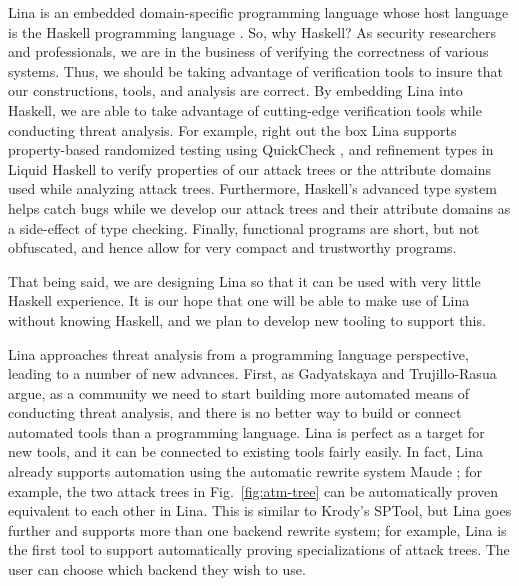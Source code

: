 \documentclass{llncs}
\begin{document}
Lina is an embedded domain-specific programming language whose host
language is the Haskell programming language \cite{jones2003haskell}.
So, why Haskell?  As security researchers and professionals, we are in
the business of verifying the correctness of various systems. Thus, we
should be taking advantage of verification tools to insure that our
constructions, tools, and analysis are correct.  By embedding Lina
into Haskell, we are able to take advantage of cutting-edge
verification tools while conducting threat analysis.  For example,
right out the box Lina supports property-based randomized testing
using QuickCheck \cite{Claessen:2011:QLT:1988042.1988046}, and
refinement types in Liquid Haskell
\cite{Vazou:2014:RTH:2692915.2628161} to verify properties of our
attack trees or the attribute domains used while analyzing attack
trees.  Furthermore, Haskell's advanced type system helps catch bugs
while we develop our attack trees and their attribute domains as a
side-effect of type checking.  Finally, functional programs are short,
but not obfuscated, and hence allow for very compact and trustworthy
programs.

That being said, we are designing Lina so that it can be used with
very little Haskell experience.  It is our hope that one will be able
to make use of Lina without knowing Haskell, and we plan to develop
new tooling to support this.

Lina approaches threat analysis from a programming language
perspective, leading to a number of new advances.  First, as
Gadyatskaya and Trujillo-Rasua \cite{10.1007/978-3-319-74860-3_9}
argue, as a community we need to start building more automated means
of conducting threat analysis, and there is no better way to build or
connect automated tools than a programming language.  Lina is perfect
as a target for new tools, and it can be connected to existing tools
fairly easily.  In fact, Lina already supports automation using the
automatic rewrite system Maude \cite{clavel2005maude}; for example,
the two attack trees in Fig.~\ref{fig:atm-tree} can be automatically
proven equivalent to each other in Lina.  This is similar to Krody's
\cite{Kordy2017} SPTool, but Lina goes further and supports more than
one backend rewrite system; for example, Lina is the first tool to
support automatically proving specializations of attack trees.  The
user can choose which backend they wish to use.



\vspace{-7px}
\end{document}
